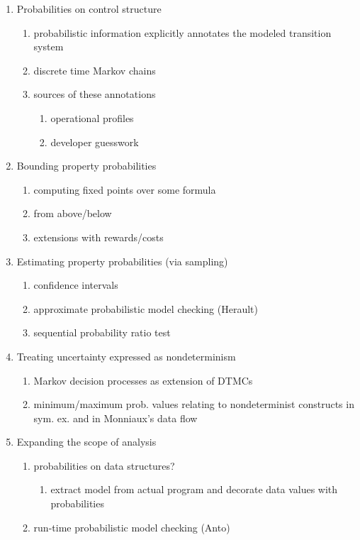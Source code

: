   \begin{enumerate}

   \item Probabilities on control structure
     \begin{enumerate}
      \item probabilistic information explicitly annotates the modeled 
            transition system
      \item discrete time Markov chains
      \item sources of these annotations
        \begin{enumerate}
         \item operational profiles
         \item developer guesswork
        \end{enumerate}
     \end{enumerate}

   \item Bounding property probabilities
     \begin{enumerate}
       \item computing fixed points over some formula
       \item from above/below
       \item extensions with rewards/costs
     \end{enumerate}

   \item Estimating property probabilities (via sampling)
     \begin{enumerate}
      \item confidence intervals
      \item approximate probabilistic model checking (Herault)
      \item sequential probability ratio test 
     \end{enumerate}

   \item Treating uncertainty expressed as nondeterminism
     \begin{enumerate}
      \item Markov decision processes as extension of DTMCs
      \item minimum/maximum prob. values relating to nondeterminist
            constructs in sym. ex. and in Monniaux's data flow
     \end{enumerate}

   \item Expanding the scope of analysis
     \begin{enumerate}
      \item probabilities on data structures?
        \begin{enumerate}
         \item extract model from actual program and decorate data
               values with probabilities
        \end{enumerate}
      \item run-time probabilistic model checking (Anto)
     \end{enumerate}

  \end{enumerate}

